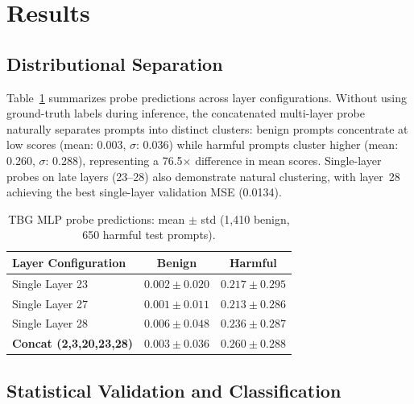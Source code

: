 \documentclass[10pt]{cai}
\begin{document}
\section{Results}

\subsection{Distributional Separation}

Table~\ref{tab:tbg_results} summarizes probe predictions across layer configurations. Without using ground-truth labels during inference, the concatenated multi-layer probe naturally separates prompts into distinct clusters: benign prompts concentrate at low scores (mean: 0.003, $\sigma$: 0.036) while harmful prompts cluster higher (mean: 0.260, $\sigma$: 0.288), representing a 76.5$\times$ difference in mean scores. Single-layer probes on late layers (23--28) also demonstrate natural clustering, with layer~28 achieving the best single-layer validation MSE (0.0134).

\begin{table}[ht]
\centering
\caption{TBG MLP probe predictions: mean $\pm$ std (1,410 benign, 650 harmful test prompts).}
\label{tab:tbg_results}
\begin{tabular}{@{}lcc@{}}
\toprule
\textbf{Layer Configuration} & \textbf{Benign} & \textbf{Harmful} \\
\midrule
Single Layer 23 & $0.002 \pm 0.020$ & $0.217 \pm 0.295$ \\
Single Layer 27 & $0.001 \pm 0.011$ & $0.213 \pm 0.286$ \\
Single Layer 28 & $0.006 \pm 0.048$ & $0.236 \pm 0.287$ \\
\midrule
\textbf{Concat (2,3,20,23,28)} & $\mathbf{0.003 \pm 0.036}$ & $\mathbf{0.260 \pm 0.288}$ \\
\bottomrule
\end{tabular}
\end{table}

\subsection{Statistical Validation and Classification}
\end{document}
